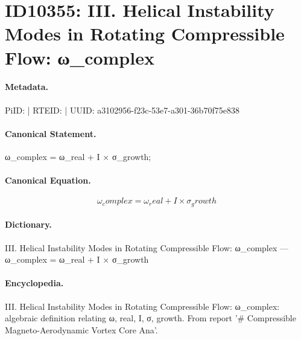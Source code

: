 \section*{ID10355: III. Helical Instability Modes in Rotating Compressible Flow: ω\_complex}
\paragraph{Metadata.}
PiID:  | RTEID:  | UUID: a3102956-f23c-53e7-a301-36b70f75e838

\paragraph{Canonical Statement.}
ω\_complex = ω\_real + I × σ\_growth;

\paragraph{Canonical Equation.}
\[
ω_complex = ω_real + I × σ_growth
\]

\paragraph{Dictionary.}
III. Helical Instability Modes in Rotating Compressible Flow: ω\_complex — ω\_complex = ω\_real + I × σ\_growth

\paragraph{Encyclopedia.}
III. Helical Instability Modes in Rotating Compressible Flow: ω\_complex: algebraic definition relating ω, real, I, σ, growth. From report '\# Compressible Magneto-Aerodynamic Vortex Core Ana'.
